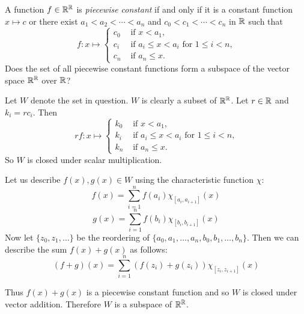 \begin{problem}[Golan 79]

A function $f \in \mathbb{R}^{\mathbb{R}}$ is \emph{piecewise constant} if and only if it is a
constant function $x \mapsto c$ or there exist 
$a_1 < a_2 < \cdots < a_n$ and 
$c_0 < c_1 < \cdots < c_n$ in $\mathbb{R}$ such that 
\[
f : x \mapsto 
\begin{cases}
  c_0 & \text{ if $x < a_1$,}\\
  c_i & \text{ if $a_i\leq x < a_i$ for $1\leq i < n$,}\\
  c_n & \text{ if $a_n\leq x$.}
\end{cases}
\]
Does the set of all piecewise constant functions form a subspace of the vector
space $\mathbb{R}^{\mathbb{R}}$ over $\mathbb{R}$?

\end{problem}
\smallskip
\begin{solution}

Let $W$ denote the set in question. $W$ is clearly a subset of $\mathbb{R}^{\mathbb{R}}$. Let $r \in \mathbb{R}$ and $k_i = rc_i$. Then
\[
rf : x \mapsto 
\begin{cases}
  k_0 & \text{ if $x < a_1$,}\\
  k_i & \text{ if $a_i\leq x < a_i$ for $1\leq i < n$,}\\
  k_n & \text{ if $a_n\leq x$.}
\end{cases}
\]
So $W$ is closed under scalar multiplication.

Let us describe $f(x),g(x) \in W$ using the characteristic function $\chi$:
$$f(x) = \sum_{i=1}^n f(a_i)\chi_{[a_i,a_{i+1}]}(x)$$
$$g(x) = \sum_{i=1}^n f(b_i)\chi_{[b_i,b_{i+1}]}(x)$$
Now let $\{z_0,z_1,\dots \}$ be the reordering of $\{a_0,a_1,\dots ,a_n,b_0,b_1,\dots ,b_n\}$. Then we can describe the sum $f(x) + g(x)$ as follows:
$$(f+g)(x) =  \sum_{i=1}^n (f(z_i)+g(z_i))\chi_{[z_i,z_{i+1}]}(x)$$

Thus $f(x) + g(x)$ is a piecewise constant function and so $W$ is closed under vector addition.  Therefore $W$ is a subspace of $\mathbb{R}^{\mathbb{R}}$.
\end{solution}
\probskip


